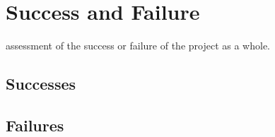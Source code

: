 \section{Success and Failure}\label{success-and-failure}

assessment of the success or failure of the project as a whole.

\subsection{Successes}\label{successes}

\subsection{Failures}\label{failures}

